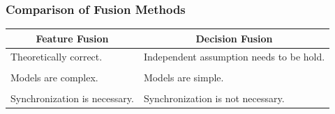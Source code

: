 \documentclass[t]{beamer}
\begin{document}
\begin{frame}
  \frametitle{Comparison of Fusion Methods}

  \centering
  \begin{tabular}{p{.42\linewidth}|p{.42\linewidth}}
    \hline
    \multicolumn{1}{c|}{\bfseries Feature Fusion} & \multicolumn{1}{c}{\bfseries Decision Fusion} \\ \hline
    Theoretically correct. & Independent assumption needs to be hold. \\
    \\
    Models are complex. & Models are simple. \\
    \\
    Synchronization is \mbox{necessary}. & Synchronization is not necessary. \\ \hline
  \end{tabular}

\end{frame}
\end{document}
